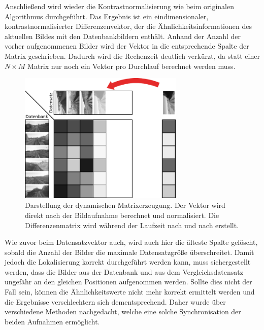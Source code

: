 \documentclass[12pt,a4paper,titlepage]{scrartcl}
\begin{document}
Anschließend wird wieder die Kontrastnormalisierung wie beim originalen Algorithmus durchgeführt. Das Ergebnis ist ein eindimensionaler, kontrastnormalisierter Differenzenvektor, der die Ähnlichkeitsinformationen des aktuellen Bildes mit den Datenbankbildern enthält. Anhand der Anzahl der vorher aufgenommenen Bilder wird der Vektor in die entsprechende Spalte der Matrix geschrieben. Dadurch wird die Rechenzeit deutlich verkürzt, da statt einer $N\times M$ Matrix nur noch ein Vektor pro Durchlauf berechnet werden muss.

\begin{figure}
	\centering
	\includegraphics[width=0.7\textwidth]{../Bilder/Differenzenmatrix_live.pdf}
	\caption[Dynamische Matrixerzeugung]{Darstellung der dynamischen Matrixerzeugung. Der Vektor wird direkt nach der Bildaufnahme berechnet und normalisiert. Die Differenzenmatrix wird während der Laufzeit nach und nach erstellt.}
	\label{img:Diff_Mat_live}
\end{figure}

Wie zuvor beim Datensatzvektor auch, wird auch hier die älteste Spalte gelöscht, sobald die Anzahl der Bilder die maximale Datensatzgröße überschreitet. Damit jedoch die Lokalisierung korrekt durchgeführt werden kann, muss sichergestellt werden, dass die Bilder aus der Datenbank und aus dem Vergleichsdatensatz ungefähr an den gleichen Positionen aufgenommen werden. Sollte dies nicht der Fall sein, können die Ähnlichkeitswerte nicht mehr korrekt ermittelt werden und die Ergebnisse verschlechtern sich dementsprechend. Daher wurde über verschiedene Methoden nachgedacht, welche eine solche Synchronisation der beiden Aufnahmen ermöglicht.
\end{document}
